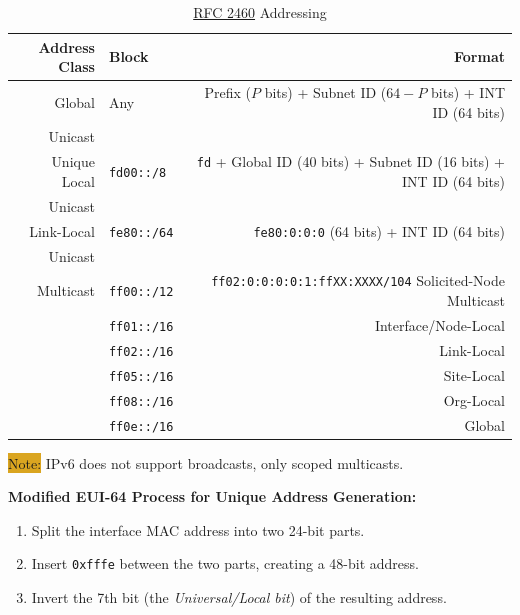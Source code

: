 \documentclass[12pt]{article}
\newcommand{\note}[1]{\colorbox{#1}{Note:}}
\newcommand{\RFC}[1]{\href{https://datatracker.ietf.org/doc/html/rfc#1}{RFC #1}}
\begin{document}
	\begin{table}[H]
	\centering
	\caption{\RFC{2460} Addressing \label{tab:ADDRESSING IPV6}}
	\begin{tabular}{rlr}
	\hline
	\textbf{Address Class}	& \textbf{Block}		& \textbf{Format}\\\hline
	Global 			& Any			& Prefix ($P$ bits) + Subnet ID ($64-P$ bits) + INT ID (64 bits)\\
	Unicast			&				&\\\hline
	Unique Local 		& \texttt{fd00::/8}		& \texttt{fd} + Global ID (40 bits) + Subnet ID (16 bits) + INT ID (64 bits)\\
	Unicast			&				&\\\hline
	Link-Local 			& \texttt{fe80::/64}	& \texttt{fe80:0:0:0} (64 bits) + INT ID (64 bits)\\
	Unicast			&				&\\\hline
	Multicast			& \texttt{ff00::/12}	& \texttt{ff02:0:0:0:0:1:ffXX:XXXX/104} Solicited-Node Multicast\\
					& \texttt{ff01::/16}	& Interface/Node-Local\\
					& \texttt{ff02::/16}	& Link-Local\\
					& \texttt{ff05::/16}	& Site-Local\\
					& \texttt{ff08::/16}	& Org-Local\\
					& \texttt{ff0e::/16}	& Global\\\hline
	\end{tabular}\end{table}
	\note{Goldenrod} IPv6 does not support broadcasts, only scoped multicasts.

	\textbf{Modified EUI-64 Process for Unique Address Generation:}
	\begin{enumerate} \itemsep -5pt
		\label{itm:EUI64}
		\item{Split the interface MAC address into two 24-bit parts.}
		\item{Insert \texttt{0xfffe} between the two parts, creating a 48-bit address.}
		\item{Invert the 7th bit (the \textit{Universal/Local bit}) of the resulting address.}
	\end{enumerate}

\end{document}
